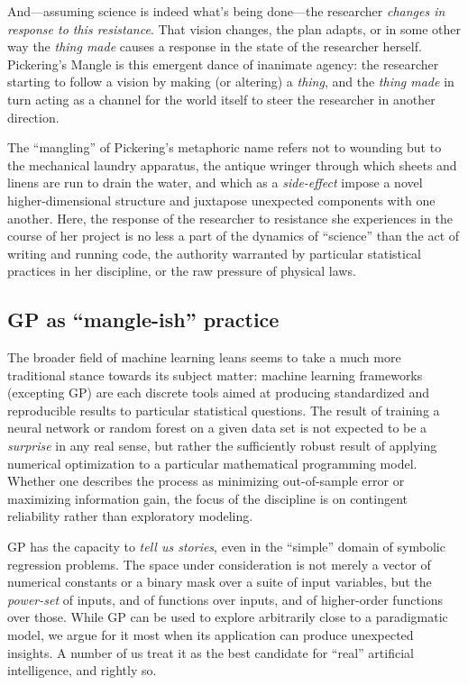 And---assuming science is indeed what's being done---the researcher \emph{changes in response to this resistance}. That vision changes, the plan adapts, or in some other way the \emph{thing made} causes a response in the state of the researcher herself. Pickering's Mangle is this emergent dance of inanimate agency: the researcher starting to follow a vision by making (or altering) a \emph{thing}, and the \emph{thing made} in turn acting as a channel for the world itself to steer the researcher in another direction.

The ``mangling'' of Pickering's metaphoric name refers not to wounding but to the mechanical laundry apparatus, the antique wringer through which sheets and linens are run to drain the water, and which as a \emph{side-effect} impose a novel higher-dimensional structure and juxtapose unexpected components with one another. Here, the response of the researcher to resistance she experiences in the course of her project is no less a part of the dynamics of ``science'' than the act of writing and running code, the authority warranted by particular statistical practices in her discipline, or the raw pressure of physical laws.

\subsection{GP as ``mangle-ish'' practice}\hypertarget{gp-as-mangle-ish-practice}{}\label{gp-as-mangle-ish-practice}

The broader field of machine learning leans seems to take a much more traditional stance towards its subject matter: machine learning frameworks (excepting GP) are each discrete tools aimed at producing standardized and reproducible results to particular statistical questions. The result of training a neural network or random forest on a given data set is not expected to be a \emph{surprise} in any real sense, but rather the sufficiently robust result of applying numerical optimization to a particular mathematical programming model. Whether one describes the process as minimizing out-of-sample error or maximizing information gain, the focus of the discipline is on contingent reliability rather than exploratory modeling.

GP has the capacity to \emph{tell us stories}, even in the ``simple'' domain of symbolic regression problems. The space under consideration is not merely a vector of numerical constants or a binary mask over a suite of input variables, but the \emph{power-set} of inputs, and of functions over inputs, and of higher-order functions over those. While GP can be used to explore arbitrarily close to a paradigmatic model, we argue for it most when its application can produce unexpected insights. A number of us treat it as the best candidate for ``real'' artificial intelligence, and rightly so.

